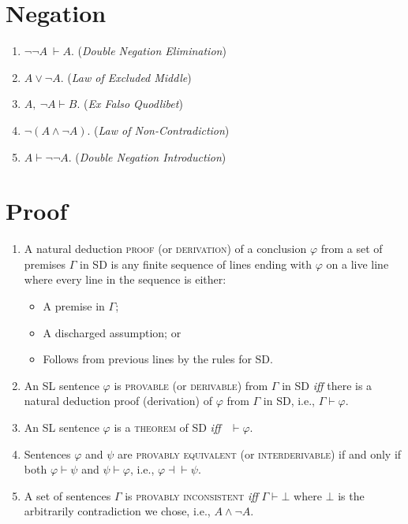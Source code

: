 \documentclass[a4paper, 11pt]{article} %
\begin{document}
\begin{multicols}{2}


\section*{Negation}

\begin{enumerate}
  \item[\it Elimination Rule:] $\neg\neg A\ \vdash A$. \quad(\textit{Double Negation Elimination})
  \item $A \vee \neg A$. \quad(\textit{Law of Excluded Middle})
  \item $A,\ \neg A \vdash B$. \quad(\textit{Ex Falso Quodlibet})
  \item[\it Introduction Rule:] $\neg(A \wedge \neg A)$. \quad(\textit{Law of Non-Contradiction})
  \item $A \vdash \neg\neg A$. \quad(\textit{Double Negation Introduction}) 
\end{enumerate}






\section*{Proof}

\begin{enumerate}
  \item[\it Proof:] A natural deduction \textsc{proof} (or \textsc{derivation}) of a conclusion $\varphi$ from a set of premises $\Gamma$ in SD is any finite sequence of lines ending with $\varphi$ on a live line where every line in the sequence is either:
      \begin{itemize}
        \item[(1)] A premise in $\Gamma$; 
        \item[(2)] A discharged assumption; or
        \item[(3)] Follows from previous lines by the rules for SD.
      \end{itemize}
  \item[\it Provable:] An SL sentence $\varphi$ is \textsc{provable} (or \textsc{derivable}) from $\Gamma$ in SD \textit{iff} there is a natural deduction proof (derivation) of $\varphi$ from $\Gamma$ in SD, i.e., $\Gamma \vdash \varphi$. 
  \item[\it Theorems:] An SL sentence $\varphi$ is a \textsc{theorem} of SD \textit{iff}~ $\vdash\varphi$.
  \item[\it Equivalent:] Sentences $\varphi$ and $\psi$ are \textsc{provably equivalent} (or \textsc{interderivable}) if and only if both $\varphi\vdash\psi$ and $\psi\vdash\varphi$, i.e., $\varphi\dashv\vdash\psi$.
  \item[\it Inconsistent:] A set of sentences $\Gamma$ is \textsc{provably inconsistent} \textit{iff} $\Gamma\vdash\bot$ where $\bot$ is the arbitrarily contradiction we chose, i.e., $A\wedge\neg A$.
\end{enumerate}




\end{multicols}
\end{document}
